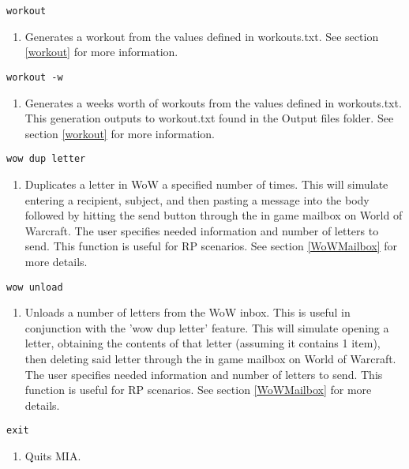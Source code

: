 \begin{lstlisting} 
workout
\end{lstlisting}
\begin{enumerate}
	\item[] Generates a workout from the values defined in workouts.txt. See section \ref{workout} for more information.
\end{enumerate}

\begin{lstlisting} 
workout -w
\end{lstlisting}
\begin{enumerate}
	\item[] Generates a weeks worth of workouts from the values defined in workouts.txt. This generation outputs to workout.txt found in the Output files folder. See section \ref{workout} for more information.
\end{enumerate}

\begin{lstlisting} 
wow dup letter
\end{lstlisting}
\begin{enumerate}
	\item[] Duplicates a letter in WoW a specified number of times. This will simulate entering a recipient, subject, and then pasting a message into the body followed by hitting the send button through the in game mailbox on World of Warcraft. The user specifies needed information and number of letters to send. This function is useful for RP scenarios. See section \ref{WoWMailbox} for more details.
\end{enumerate}

\begin{lstlisting} 
wow unload
\end{lstlisting}
\begin{enumerate}
	\item[] Unloads a number of letters from the WoW inbox. This is useful in conjunction with the 'wow dup letter' feature. This will simulate opening a letter, obtaining the contents of that letter (assuming it contains 1 item), then deleting said letter through the in game mailbox on World of Warcraft. The user specifies needed information and number of letters to send. This function is useful for RP scenarios. See section \ref{WoWMailbox} for more details.
\end{enumerate}

\begin{lstlisting} 
exit  
\end{lstlisting}
\begin{enumerate}
	\item[] Quits MIA. 
\end{enumerate}